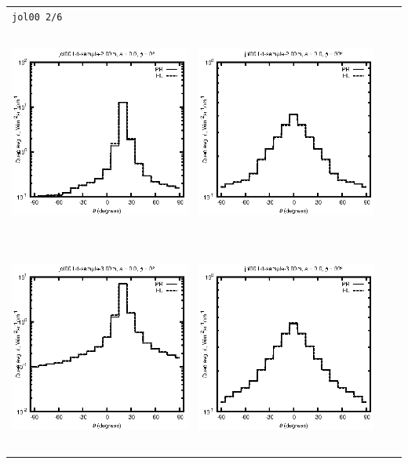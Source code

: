 \begin{tabular}{c c c c}
\multicolumn{4}{l}{\texttt{jol00 2/6}} \\
\includegraphics[height=7cm]{../eps/jol00_Ld_sample_2.00m_fwd.eps} &
\includegraphics[height=7cm]{../eps/jol00_Ld_sample_2.00m_cross.eps} \\
\includegraphics[height=7cm]{../eps/jol00_Ld_sample_3.00m_fwd.eps} &
\includegraphics[height=7cm]{../eps/jol00_Ld_sample_3.00m_cross.eps} \\

\end{tabular}
